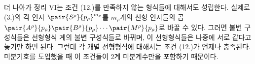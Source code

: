 
더 나아가 정리 VI는 조건 (12.)를 만족하지 않는 형식들에 대해서도 성립한다. 실제로 (3.)의 각 인자 $\pair{S^\rho}{p_\rho}^{m_\rho}$를 $m_\rho$개의 선형 인자들의 곱 $\pair{A^\rho}{p_\rho}\pair{B^\rho}{p_\rho}\cdots\pair{M^\rho}{p_\rho}$로 바꿀 수 있다. 그러면 불변 구성식들은 선형형식 계의 불변 구성식들로 바뀌며, 이 선형형식들은 나중에 서로 같다고 놓기만 하면 된다. 그런데 각 개별 선형형식에 대해서는 조건 (12.)가 언제나 충족된다. 미분기호를 도입했을 때 이 조건들이 2계 미분계수만을 포함하기 때문이다.
